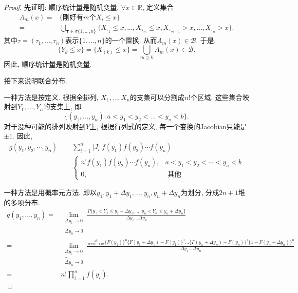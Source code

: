 \documentclass[UTF8, a4paper]{article}
\begin{document}
\begin{proof}
先证明: 顺序统计量是随机变量.
\(\forall x \in \mathbb{R}\), 定义集合
$$
\begin{aligned}
    A_m(x) =& \{\text{刚好有} m \text{个} X_i \leq x\} \\
           =& \bigcup_{\mathbf{\tau} \in \sigma\{1, ..., n\}}\{X_{\tau_1} \leq x, ..., X_{\tau_m} \leq x, X_{\tau_{m+1}} > x, ..., X_{\tau_n} > x\}.
\end{aligned}
$$
其中\(\tau = (\tau_1, ..., \tau_n)\)表示\(\{1, ..., n\}\)的一个置换.
从而\(A_m(x) \in \mathcal{B}\).
于是, 
$$
\{Y_k \leq x\} = \{X_{(k)} \leq x\} = \bigcup_{m\geq k} A_m(x) \in \mathcal{B}.
$$
因此, 顺序统计量是随机变量.

接下来说明联合分布.

一种方法是按定义. 根据全排列, \(X_1, ..., X_n\)的支集可以分割成\(n!\)个区域. 
这些集合映射到\(Y_1, ..., Y_n\)的支集上, 即
$$
\{(y_1, ..., y_n): a < y_1 < y_2 < ... < y_n < b\}.
$$
对于没种可能的排列映射到\(Y\)上, 根据行列式的定义, 每一个变换的Jacobian只能是\(\pm 1\).
因此, 
$$
\begin{aligned}
g\left(y_1, y_2, \cdots, y_n\right) & =\sum_{i=1}^{n!}\left|J_i\right| f\left(y_1\right) f\left(y_2\right) \cdots f\left(y_n\right) \\
& = \begin{cases}n!f\left(y_1\right) f\left(y_2\right) \cdots f\left(y_n\right), & a<y_1<y_2<\cdots<y_n<b \\
0, & \text { 其他 }\end{cases}
\end{aligned}
$$


一种方法是用概率元方法. 即以\(y_1, y_1 + \Delta y_1, ..., y_n, y_n+\Delta y_n\)为划分, 分成\(2n+1\)堆的多项分布.
$$
\begin{aligned}
g(y_1, ..., y_n) =& \lim_{\substack{\Delta y_1 \to 0 \\ ... \\ \Delta y_n \to 0}} \frac{P\{y_1 < Y_1 \leq y_1 + \Delta y_1, ..., y_n < Y_n \leq y_n + \Delta y_n\}}{\Delta y_1 ... \Delta y_n} \\
=& \lim_{\substack{\Delta y_1 \to 0 \\ ... \\ \Delta y_n \to 0}} \frac{\frac{n!}{0! 1! 0! ... 1! 0!}\{F(y_1)\}^0 \{F(y_1 + \Delta y_1) - F(y_1)\}^1 ... \{F(y_n + \Delta y_n) - F(y_n)\}^1 \{1 - F(y_n + \Delta y_n)\}^0}{\Delta y_1 ... \Delta y_n}\\
=& n! \prod_{i=1}^n f(y_i).
\end{aligned}
$$
\end{proof}
\end{document}
